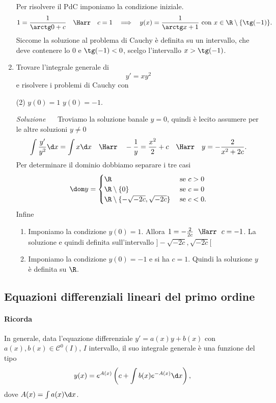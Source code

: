 \documentclass{article}
\newcommand{\se}{\text{ se }}
\begin{document}
\begin{enumerate}[label=\textbf{Esercizio 13.\arabic*.},itemindent=*]
Per risolvere il PdC imponiamo la condizione iniziale.
\[1=\frac{1}{\arctg 0 +c}~~~\Harr~~~c=1~~\implies~~y(x)=\frac{1}{\arctg x +1} \text{ con }x\in \R\setminus \{\tg (-1)\}.\]
Siccome la soluzione al problema di Cauchy è definita su un intervallo, che deve contenere lo $0$ e $\tg (-1)<0$, scelgo l'intervallo $x>\tg(-1)$.
\item Trovare l'integrale generale di 
\[
    y'=xy^2
\]
e risolvere i problemi di Cauchy con
\begin{tasks}(2)
    \task $y(0)=1$ \task $y(0)=-1$.
\end{tasks}
\item[\textit{\large Soluzione~}]~ Troviamo la soluzione banale $y=0$, quindi è lecito assumere per le altre soluzioni $y\neq 0$
\[\int \frac{y'}{y^2}\d x=\int x \d x~~~\Harr~~~-\frac{1}{y}=\frac{x^2}{2}+c~~~\Harr~~~y=-\frac{2}{x^2+2c}.\]
Per determinare il dominio dobbiamo separare i tre casi
\[\dom y=\begin{cases}
    \R &\se c>0\\
    \R\setminus \{0\}&\se c=0\\
    \R\setminus \{-\sqrt{-2c}, \sqrt{-2c}\}&\se c< 0.
\end{cases}\]
Infine
\begin{enumerate}
    \item Imponiamo la condizione $y(0)=1$. Allora $1=-\frac{2}{2c}~~\Harr~~c=-1$. La soluzione e quindi definita sull'intervallo $]-\sqrt{-2c}, \sqrt{-2c}[$
    \item Imponiamo la condizione $y(0)=-1$ e si ha $c=1$. Quindi la soluzione $y$ è definita su $\R$.
\end{enumerate}
\end{enumerate}
\vspace{1cm}
\subsection*{Equazioni differenziali lineari del primo ordine}

\begin{lineframe}
    \paragraph*{Ricorda} In generale, data l'equazione differenziale $y'=a(x)y+b(x)$ con $a(x),b(x)\in \mathcal{C}^0(I)$, $I$ intervallo, il suo integrale generale è una funzione del tipo 
    \[y(x)=e^{A(x)}\left( c+\int b(x)e^{-A(x)}\d x \right),\]
    dove $A(x)=\int a(x)\d x$.
\end{lineframe}
\end{document}
